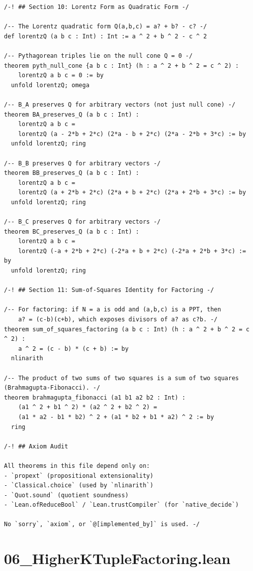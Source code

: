 \documentclass[11pt,twoside,openright]{book}
\theoremstyle{definition}
\theoremstyle{remark}
\begin{document}
\begin{lstlisting}[style=lean]
/-! ## Section 10: Lorentz Form as Quadratic Form -/

/-- The Lorentz quadratic form Q(a,b,c) = a? + b? - c? -/
def lorentzQ (a b c : Int) : Int := a ^ 2 + b ^ 2 - c ^ 2

/-- Pythagorean triples lie on the null cone Q = 0 -/
theorem pyth_null_cone {a b c : Int} (h : a ^ 2 + b ^ 2 = c ^ 2) :
    lorentzQ a b c = 0 := by
  unfold lorentzQ; omega

/-- B_A preserves Q for arbitrary vectors (not just null cone) -/
theorem BA_preserves_Q (a b c : Int) :
    lorentzQ a b c =
    lorentzQ (a - 2*b + 2*c) (2*a - b + 2*c) (2*a - 2*b + 3*c) := by
  unfold lorentzQ; ring

/-- B_B preserves Q for arbitrary vectors -/
theorem BB_preserves_Q (a b c : Int) :
    lorentzQ a b c =
    lorentzQ (a + 2*b + 2*c) (2*a + b + 2*c) (2*a + 2*b + 3*c) := by
  unfold lorentzQ; ring

/-- B_C preserves Q for arbitrary vectors -/
theorem BC_preserves_Q (a b c : Int) :
    lorentzQ a b c =
    lorentzQ (-a + 2*b + 2*c) (-2*a + b + 2*c) (-2*a + 2*b + 3*c) := by
  unfold lorentzQ; ring

/-! ## Section 11: Sum-of-Squares Identity for Factoring -/

/-- For factoring: if N = a is odd and (a,b,c) is a PPT, then
    a? = (c-b)(c+b), which exposes divisors of a? as c?b. -/
theorem sum_of_squares_factoring (a b c : Int) (h : a ^ 2 + b ^ 2 = c ^ 2) :
    a ^ 2 = (c - b) * (c + b) := by
  nlinarith

/-- The product of two sums of two squares is a sum of two squares (Brahmagupta-Fibonacci). -/
theorem brahmagupta_fibonacci (a1 b1 a2 b2 : Int) :
    (a1 ^ 2 + b1 ^ 2) * (a2 ^ 2 + b2 ^ 2) =
    (a1 * a2 - b1 * b2) ^ 2 + (a1 * b2 + b1 * a2) ^ 2 := by
  ring

/-! ## Axiom Audit

All theorems in this file depend only on:
- `propext` (propositional extensionality)
- `Classical.choice` (used by `nlinarith`)
- `Quot.sound` (quotient soundness)
- `Lean.ofReduceBool` / `Lean.trustCompiler` (for `native_decide`)

No `sorry`, `axiom`, or `@[implemented_by]` is used. -/
\end{lstlisting}

\clearpage

\section*{06\_HigherKTupleFactoring.lean}
\end{document}
